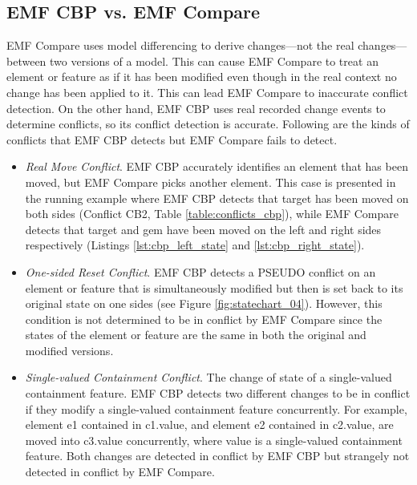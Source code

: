 \subsection{EMF CBP vs. EMF Compare}
\label{sec:emf_cbp_vs_emf_compare}
EMF Compare uses model differencing to derive changes—not the real changes—between two versions of a model. This can cause EMF Compare to treat an element or feature as if it has been modified even though in the real context no change has been applied to it. This can lead EMF Compare to inaccurate conflict detection. On the other hand, EMF CBP uses real recorded change events to determine conflicts, so its conflict detection is accurate. Following are the kinds of conflicts that EMF CBP detects but EMF Compare fails to detect.
\begin{itemize}
  
  \item \emph{Real Move Conflict}. EMF CBP accurately identifies an element that has been moved, but EMF Compare picks another element. This case is presented in the running example where EMF CBP detects that \textsf{target} has been moved on both sides (Conflict CB2, Table \ref{table:conflicts_cbp}), while EMF Compare detects that \textsf{target} and \textsf{gem} have been moved on the left and right sides respectively (Listings \ref{lst:cbp_left_state} and \ref{lst:cbp_right_state}).
  
  \item \emph{One-sided Reset Conflict}. EMF CBP detects a \textsf{PSEUDO} conflict on an element or feature that is simultaneously modified but then is set back to its original state on one sides (see Figure \ref{fig:statechart_04}). However, this condition is not determined to be in conflict by EMF Compare since the states of the element or feature are the same in both the original and modified versions.
  
  \item \emph{Single-valued Containment Conflict}. The change of state of a single-valued containment feature. EMF CBP detects two different changes to be in conflict if they modify a single-valued containment feature concurrently. For example, element \textsf{e1} contained in \textsf{c1}.\textsf{value}, and element \textsf{e2} contained in \textsf{c2}.\textsf{value}, are moved into \textsf{c3}.\textsf{value} concurrently, where \textsf{value} is a single-valued containment feature. Both changes are detected in conflict by EMF CBP but strangely not detected in conflict by EMF Compare.
\end{itemize}

